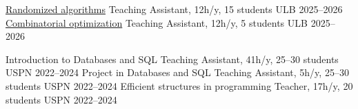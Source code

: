 


\begin{cvhonors}
	\cvhonor
	{\href{https://www.ulb.be/en/programme/info-f413-1}{Randomized algorithms}} %
	{Teaching Assistant, 12h/y, 15 students} %
	{ULB} %
	{2025--2026} %
	\cvhonor
	{\href{https://www.ulb.be/fr/programme/info-f424-1}{Combinatorial optimization}} %
	{Teaching Assistant, 12h/y, 5 students} %
	{ULB} %
	{2025--2026} %

  \cvhonor
    {Introduction to Databases and SQL} %
    {Teaching Assistant, 41h/y, 25--30 students} %
    {USPN} %
    {2022--2024} %
    \cvhonor
    {Project in Databases and SQL} %
    {Teaching Assistant, 5h/y, 25--30 students} %
    {USPN} %
    {2022--2024} %
	\cvhonor
	{Efficient structures in programming} %
	{Teacher, 17h/y, 20 students} %
	{USPN} %
	{2022--2024} %
\end{cvhonors}
